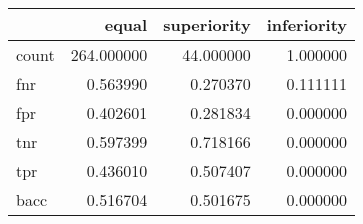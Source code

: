 \begin{tabular}{lrrr}
\toprule
{} &       equal &  superiority &  inferiority \\
\midrule
count &  264.000000 &    44.000000 &     1.000000 \\
fnr   &    0.563990 &     0.270370 &     0.111111 \\
fpr   &    0.402601 &     0.281834 &     0.000000 \\
tnr   &    0.597399 &     0.718166 &     0.000000 \\
tpr   &    0.436010 &     0.507407 &     0.000000 \\
bacc  &    0.516704 &     0.501675 &     0.000000 \\
\bottomrule
\end{tabular}
